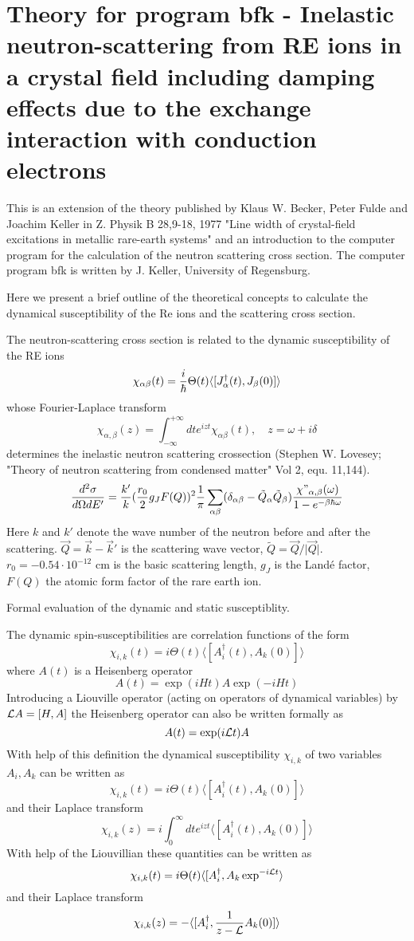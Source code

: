 \section{Theory for  program {\prg bfk} - Inelastic neutron-scattering from RE ions in a crystal field
including damping effects due to the exchange interaction with conduction
electrons}\label{bfktheory}

\medskip
This is an extension  of the theory published by Klaus W. Becker, Peter Fulde and
Joachim Keller in Z. Physik B 28,9-18, 1977 \cite{becker77-9}
"Line width of crystal-field excitations in metallic rare-earth systems"
and an  introduction to the computer program for the calculation of  the neutron 
scattering cross section. The computer program {\prg bfk} is written by J. Keller,
University of Regensburg.

\noindent
Here we present a brief outline of the theoretical concepts to calculate the
dynamical susceptibility of the Re ions and the scattering cross section.  

The neutron-scattering cross section is related to the dynamic susceptibility
of the  RE ions 
$$
\chi_{\alpha\beta}(t)={i\over \hbar} \Theta(t)\langle [J^\dagger_\alpha(t), J_\beta(0)]\rangle 
$$
whose Fourier-Laplace transform
$$
\chi_{\alpha,\beta}(z)=\int_{-\infty}^{+\infty} dt e^{izt}\chi_{\alpha\beta}(t), \quad z=\omega
+i\delta 
$$
determines the inelastic neutron scattering crossection   
(Stephen W. Lovesey; "Theory of neutron 
scattering from condensed matter"
Vol 2, equ. 11,144).
$$
{d^2\sigma \over d\Omega d E'}=  {k' \over
k}({r_0\over 2}g_J F(Q))^2{1\over \pi }
\sum_{\alpha\beta}(\delta_{\alpha\beta} 
- \tilde Q_\alpha \tilde Q_\beta)
{ \chi{"}_{\alpha,\beta}(\omega)\over 1-e^{-\beta \hbar \omega}} 
$$
Here $k$ and
$ k'$ denote the  wave number of the neutron before and after the
scattering. $\vec Q = \vec k - \vec k'$ is the scattering wave vector,
$\tilde Q = \vec Q/\vert\vec Q\vert$. 
$r_0= -0.54 \cdot 10^{-12}$ cm is the basic scattering length, $g_J$ is the Land\'e factor, 
$F(Q)$ the atomic form factor of the
rare earth ion.
  
\bigskip
\noindent
Formal evaluation of the dynamic and static susceptiblity.

The dynamic spin-susceptibilities are correlation functions of the form
$$
\chi_{i,k}(t)=i \Theta(t) \langle [A_i^\dagger(t),A_k(0)]\rangle
$$ 
where $A(t)$ is a Heisenberg operator
$$
A(t)= \exp(iHt)A\exp(-iHt)
$$
Introducing a Liouville operator (acting on operators of dynamical
variables) by ${\cal L}A = [H,A]$  the Heisenberg operator can also be
written formally as  
$$
A(t)= \exp(i{\cal L}t) A
$$
With help of this definition the dynamical susceptibility $\chi_{i,k}$ of 
two variables $A_i, A_k$ can be written as
$$
\chi_{i,k}(t)=i \Theta(t) \langle [A_i^\dagger(t),A_k(0)]\rangle
$$ 
and their Laplace transform
$$
\chi_{i,k}(z)=i\int_0^\infty dt e^{izt} \langle [A_i^\dagger(t),A_k(0)]\rangle
$$ 
With help of the Liouvillian these quantities can be written as
$$
\chi_{i,k}(t)=i \Theta(t) \langle [A_i^\dagger,A_k\exp^{-i{\cal L}t}\rangle
$$
and their Laplace transform
$$
\chi_{i,k}(z)= -\langle [A_i^\dagger,{1\over {z-\cal
L}}A_k(0)]\rangle
$$ 

